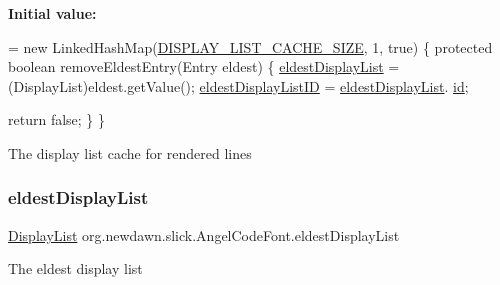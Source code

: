 {\bfseries Initial value\+:}
\begin{DoxyCode}
= \textcolor{keyword}{new} LinkedHashMap(\mbox{\hyperlink{classorg_1_1newdawn_1_1slick_1_1_angel_code_font_a493a4a9c0c402ad916d51ef38b66e036}{DISPLAY\_LIST\_CACHE\_SIZE}}, 1, \textcolor{keyword}{true}) \{
        \textcolor{keyword}{protected} \textcolor{keywordtype}{boolean} removeEldestEntry(Entry eldest) \{
            \mbox{\hyperlink{classorg_1_1newdawn_1_1slick_1_1_angel_code_font_a82733df33c4098515ea0a832ca7218da}{eldestDisplayList}} = (DisplayList)eldest.getValue();
            \mbox{\hyperlink{classorg_1_1newdawn_1_1slick_1_1_angel_code_font_ac8dc56c5ce3f951729b7239efd3811df}{eldestDisplayListID}} = \mbox{\hyperlink{classorg_1_1newdawn_1_1slick_1_1_angel_code_font_a82733df33c4098515ea0a832ca7218da}{eldestDisplayList}}.
      \mbox{\hyperlink{classorg_1_1newdawn_1_1slick_1_1_angel_code_font_1_1_display_list_a2a19c792a8181979c428fe07f780b137}{id}};

            \textcolor{keywordflow}{return} \textcolor{keyword}{false};
        \}
    \}
\end{DoxyCode}
The display list cache for rendered lines \mbox{\label{classorg_1_1newdawn_1_1slick_1_1_angel_code_font_a82733df33c4098515ea0a832ca7218da}} 
\subsubsection{\texorpdfstring{eldest\+Display\+List}{eldestDisplayList}}
{\footnotesize\ttfamily \mbox{\hyperlink{classorg_1_1newdawn_1_1slick_1_1_angel_code_font_1_1_display_list}{Display\+List}} org.\+newdawn.\+slick.\+Angel\+Code\+Font.\+eldest\+Display\+List\hspace{0.3cm}{\ttfamily [private]}}

The eldest display list \mbox{\label{classorg_1_1newdawn_1_1slick_1_1_angel_code_font_ac8dc56c5ce3f951729b7239efd3811df}} 
